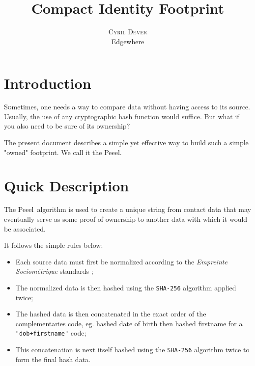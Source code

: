 \documentclass[twoside,twocolumn]{article}
\title{Compact Identity Footprint} %
\author{%
    \textsc{Cyril Dever}\\ %
    \normalsize Edgewhere \\ %
}
\date{\DTMusedate{thedate}}
\theoremstyle{definition}
\theoremstyle{remark}
\begin{document}
\maketitle


\section{Introduction}

\lettrine[nindent=0em,lines=3]{S}ometimes, one needs a way to compare data without having access to its source. Usually, the use of any cryptographic 
hash function would suffice. But what if you also need to be sure of its ownership?

The present document describes a simple yet effective way to build such a simple "owned" footprint.
We call it the Peeel\texttrademark.


\section{Quick Description}

The Peeel\texttrademark~algorithm is used to create a unique string from contact data that may eventually serve as some proof of ownership to another 
data with which it would be associated.

It follows the simple rules below:
\begin{itemize}
    \item Each source data must first be normalized according to the \emph{Empreinte Sociométrique} standards \cite{empreinteSociometrique:cyd};
    \item The normalized data is then hashed using the \texttt{SHA-256} algorithm applied twice;
    \item The hashed data is then concatenated in the exact order of the complementaries code, eg. hashed date of birth then hashed firstname 
        for a \texttt{"dob+firstname"} code;
    \item This concatenation is next itself hashed using the \texttt{SHA-256} algorithm twice to form the final hash data.
\end{itemize}
\end{document}
